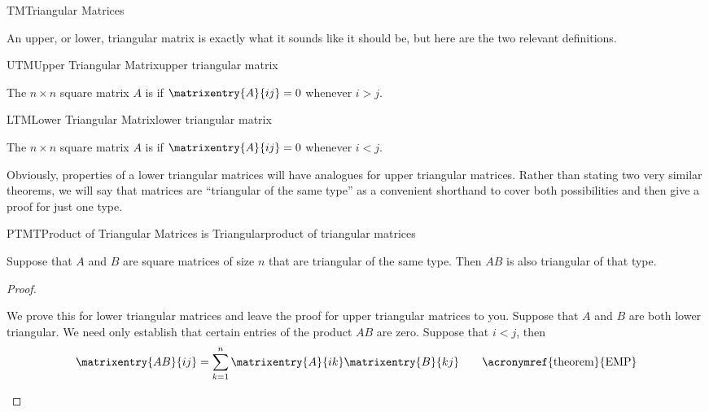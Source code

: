 \begin{subsect}{TM}{Triangular Matrices}
%
\begin{para}An upper, or lower, triangular matrix is exactly what it sounds like it should be, but here are the two relevant definitions.\end{para}
%
\begin{definition}{UTM}{Upper Triangular Matrix}{upper triangular matrix}
\begin{para}The $n\times n$ square matrix $A$ is  if $\matrixentry{A}{ij} =0$ whenever $i>j$.\end{para}
\end{definition}
%
\begin{definition}{LTM}{Lower Triangular Matrix}{lower triangular matrix}
\begin{para}The $n\times n$ square matrix $A$ is  if $\matrixentry{A}{ij} =0$ whenever 
$i<j$.
\end{para}
\end{definition}
%
\begin{para}Obviously, properties of a lower triangular matrices will have analogues for upper triangular matrices.  Rather than stating two very similar theorems, we will say that matrices are ``triangular of the same type'' as a convenient shorthand to cover both possibilities and then give a proof for just one type.\end{para}
%
\begin{theorem}{PTMT}{Product of Triangular Matrices is Triangular}{product of triangular matrices}
\begin{para}Suppose that $A$ and $B$ are square matrices of size $n$ that are triangular of the same type.  Then $AB$ is also triangular of that type.\end{para}
\end{theorem}
%
\begin{proof}
\begin{para}We prove this for lower triangular matrices and leave the proof for upper triangular matrices to you.  Suppose that $A$ and $B$ are both lower triangular.  We need only establish that certain entries of the product $AB$ are zero.  Suppose that
$i<j$,
then
%
%
\begin{align*}
\matrixentry{AB}{ij}
&=
\sum_{k=1}^{n}\matrixentry{A}{ik}\matrixentry{B}{kj}
&&&&\text{\acronymref{theorem}{EMP}}\\

\end{align*}
\end{para}
\end{proof}
\end{subsect}
